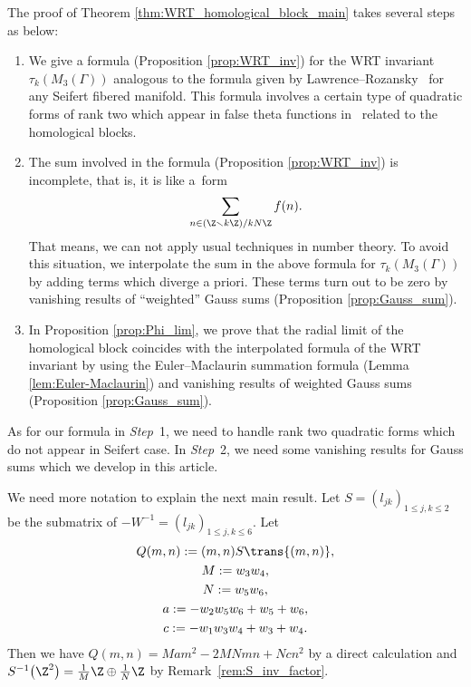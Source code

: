 The proof of Theorem \ref{thm:WRT_homological_block_main} takes several steps as below:
\begin{enumerate}\itemsep=0pt
\setlength{\leftskip}{0.45cm}
	\item[$Step~1.$]%
We give a formula (Proposition \ref{prop:WRT_inv}) for the WRT invariant $\tau_{k}(M_{3}(\Gamma))$ analogous to the formula given by Lawrence--Rozansky~\cite[formula~(4.2)]{LR} for any Seifert fibered manifold.
	This formula involves a certain type of quadratic forms of rank two which appear in false theta functions in~\cite[Proposition 5.3]{BMM} related to the homological blocks.
	\item[$Step~2.$] %
The sum involved in the formula (Proposition \ref{prop:WRT_inv}) is incomplete, that is, it is like a~form
	\begin{gather*}
	\sum_{n \in (\Z \smallsetminus k\Z)/kN\Z} f(n).
	\end{gather*}
	That means, we can not apply usual techniques in number theory.
	To avoid this situation, we interpolate the sum in the above formula for $\tau_{k}(M_{3}(\Gamma))$ by adding terms which diverge a priori.
	These terms turn out to be zero by vanishing results of ``weighted'' Gauss sums (Proposition \ref{prop:Gauss_sum}).
	\item[$Step~3.$] %
In Proposition \ref{prop:Phi_lim}, we prove that the radial limit of the homological block coincides with the interpolated formula of the WRT invariant by using the Euler--Maclaurin summation formula (Lemma \ref{lem:Euler-Maclaurin}) and vanishing results of weighted Gauss sums (Proposition \ref{prop:Gauss_sum}).
\end{enumerate}
As for our formula in \emph{Step}~1, we need to handle rank two quadratic forms which do not appear in Seifert case.
In \emph{Step}~2, we need some vanishing results for Gauss sums which we develop in this article.

We need more notation to explain the next main result.
Let $ S = ( l_{jk})_{1 \le j, k \le 2} $ be the submatrix of $ -W^{-1} = (l_{jk})_{1 \le j, k \le 6} $.
Let
\begin{gather*}
Q(m, n) := (m, n) S \trans{(m, n)}, \\
M := w_3 w_4, \\
N := w_5 w_6,
\\
a := -w_2 w_5 w_6 + w_5 + w_6, \\
c := -w_1 w_3 w_4 + w_3 + w_4.
\end{gather*}
Then we have $ Q(m, n) = Mam^2 - 2MNmn + Ncn^2 $ by a direct calculation and $ S^{-1}\big(\Z^2\big) = \frac{1}{M}\Z \oplus \frac{1}{N}\Z $ by Remark~\ref{rem:S_inv_factor}.

